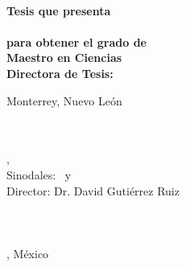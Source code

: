 \begin{titlepage}
	{\large \color{ctcolortitle}\textbf{\thesisTitle} \\[10mm]}
	{\large \textbf{Tesis que presenta}} \\[4mm]
	{\large \thesisName} \\[4mm]
	{\large \textbf{para obtener el grado de}} \\[4mm]
	{\large \textbf{Maestro en Ciencias}}\\[4mm]
	{\large \textbf{Directora de Tesis:} \thesisFirstSupervisor} \\[10mm]
	\vfill
	\begin{flushleft}
		{\large Monterrey, Nuevo León}
		\hfill
		{\large \thesisDate}
	\end{flushleft}

\end{titlepage}


\hfill
\vfill
{
	\small
	\textbf{\thesisName} \\
	\textit{\thesisTitle} \\
	\thesisSubject, \thesisDate \\
	Sinodales: \thesisFirstReviewer\ y \thesisSecondReviewer \\
	Director: Dr. David Gutiérrez Ruiz\\[1.5em]
	\textbf{\thesisUniversity} \\
	\thesisUniversityDepartment \\
	\thesisUniversityStreetAddress \thesisUniversityPostalCode\\ 
	\thesisUniversityCity, México
}
